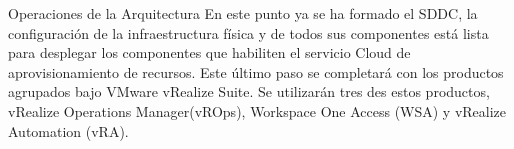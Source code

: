 \begin{subsection}{Operaciones de la Arquitectura}
    En este punto ya se ha formado el SDDC, la configuración de la infraestructura física y de todos sus componentes está lista para desplegar los componentes que habiliten el servicio Cloud de aprovisionamiento de recursos. Este último paso se completará con los productos agrupados bajo VMware vRealize Suite. Se utilizarán tres des estos productos, vRealize Operations Manager(vROps), Workspace One Access (WSA) y vRealize Automation (vRA).

\end{subsection}
